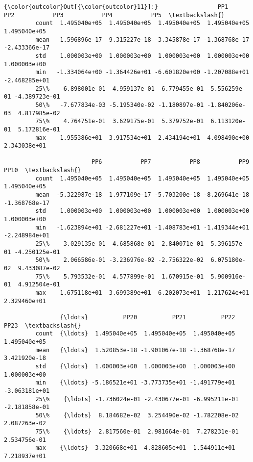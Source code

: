 \documentclass[11pt]{article}
\begin{document}
\begin{Verbatim}[commandchars=\\\{\}]
{\color{outcolor}Out[{\color{outcolor}11}]:}                 PP1           PP2           PP3           PP4           PP5  \textbackslash{}
         count  1.495040e+05  1.495040e+05  1.495040e+05  1.495040e+05  1.495040e+05   
         mean   1.596896e-17  9.315227e-18 -3.345878e-17 -1.368768e-17 -2.433366e-17   
         std    1.000003e+00  1.000003e+00  1.000003e+00  1.000003e+00  1.000003e+00   
         min   -1.334064e+00 -1.364426e+01 -6.601820e+00 -1.207088e+01 -2.468285e+01   
         25\%   -6.898001e-01 -4.959137e-01 -6.779455e-01 -5.556259e-01 -4.389723e-01   
         50\%   -7.677834e-03 -5.195340e-02 -1.180897e-01 -1.840206e-03  4.817985e-02   
         75\%    4.764751e-01  3.629175e-01  5.379752e-01  6.113120e-01  5.172816e-01   
         max    1.955386e+01  3.917534e+01  2.434194e+01  4.098490e+00  2.343038e+01   
         
                         PP6           PP7           PP8           PP9          PP10  \textbackslash{}
         count  1.495040e+05  1.495040e+05  1.495040e+05  1.495040e+05  1.495040e+05   
         mean  -5.322987e-18  1.977109e-17 -5.703200e-18 -8.269641e-18 -1.368768e-17   
         std    1.000003e+00  1.000003e+00  1.000003e+00  1.000003e+00  1.000003e+00   
         min   -1.623894e+01 -2.681227e+01 -1.408783e+01 -1.419344e+01 -2.248984e+01   
         25\%   -3.029135e-01 -4.685868e-01 -2.840071e-01 -5.396157e-01 -4.250125e-01   
         50\%    2.066586e-01 -3.236976e-02 -2.756322e-02  6.075180e-02  9.433087e-02   
         75\%    5.793532e-01  4.577899e-01  1.670915e-01  5.900916e-01  4.912504e-01   
         max    1.675118e+01  3.699389e+01  6.202073e+01  1.217624e+01  2.329460e+01   
         
                {\ldots}          PP20          PP21          PP22          PP23  \textbackslash{}
         count  {\ldots}  1.495040e+05  1.495040e+05  1.495040e+05  1.495040e+05   
         mean   {\ldots}  1.520853e-18 -1.901067e-18 -1.368768e-17  3.421920e-18   
         std    {\ldots}  1.000003e+00  1.000003e+00  1.000003e+00  1.000003e+00   
         min    {\ldots} -5.186521e+01 -3.773735e+01 -1.491779e+01 -3.063181e+01   
         25\%    {\ldots} -1.736024e-01 -2.430677e-01 -6.995211e-01 -2.181858e-01   
         50\%    {\ldots}  8.184682e-02  3.254490e-02 -1.782208e-02  2.087263e-02   
         75\%    {\ldots}  2.817560e-01  2.981664e-01  7.278231e-01  2.534756e-01   
         max    {\ldots}  3.320668e+01  4.828605e+01  1.544911e+01  7.218937e+01   
         

\end{Verbatim}
\end{document}
